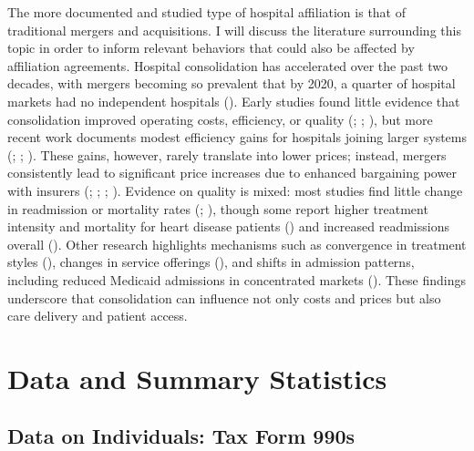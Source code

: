 \documentclass[12pt]{article}
\begin{document}
    The more documented and studied type of hospital affiliation is that of traditional mergers and acquisitions. I will discuss the literature surrounding this topic in order to inform relevant behaviors that could also be affected by affiliation agreements. Hospital consolidation has accelerated over the past two decades, with mergers becoming so prevalent that by 2020, a quarter of hospital markets had no independent hospitals (\cite{ElevanceHealth2023}). Early studies found little evidence that consolidation improved operating costs, efficiency, or quality (\cite{alexander1996short}; \cite{ho2000hospital}; \cite{dranove2003hospital}), but more recent work documents modest efficiency gains for hospitals joining larger systems (\cite{schmitt2017hospital}; \cite{andreyeva2024corporatization}; \cite{craig2021mergers}). These gains, however, rarely translate into lower prices; instead, mergers consistently lead to significant price increases due to enhanced bargaining power with insurers (\cite{gaynor2012impact}; \cite{boozary2019association}; \cite{cooper2019price}; \cite{andreyeva2024corporatization}). Evidence on quality is mixed: most studies find little change in readmission or mortality rates (\cite{haas2011mergers}; \cite{beaulieu2020changes}), though some report higher treatment intensity and mortality for heart disease patients (\cite{hayford2012impact}) and increased readmissions overall (\cite{andreyeva2024corporatization}). Other research highlights mechanisms such as convergence in treatment styles (\cite{eliason2020acquisitions}), changes in service offerings (\cite{mariani2022impact}), and shifts in admission patterns, including reduced Medicaid admissions in concentrated markets (\cite{desai2023hospital}). These findings underscore that consolidation can influence not only costs and prices but also care delivery and patient access.

   
    \section{Data and Summary Statistics}\label{sec:data}

    \subsection{Data on Individuals: Tax Form 990s}\label{sec:990s}
\end{document}
